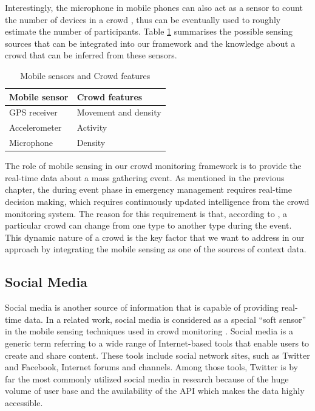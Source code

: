 Interestingly, the microphone in mobile phones can also act as a sensor to count the number of devices in a crowd \citep{Kannan2012, Xu2013}, thus can be eventually used to roughly estimate the number of participants. Table \ref{table:mobileSensingCrowdFeature} summarises the possible sensing sources that can be integrated into our framework and the knowledge about a crowd that can be inferred from these sensors.

\begin{table}
	\caption{Mobile sensors and Crowd features}
	\label{table:mobileSensingCrowdFeature}
	\centering
	\begin{tabular}{|l|l|}
		\hline
		\textbf{Mobile sensor} & \textbf{Crowd features} \\
		\hline
		GPS receiver & Movement and density \\
		\hline
		Accelerometer & Activity \\
		\hline
		Microphone & Density \\
		\hline
	\end{tabular}
\end{table}

The role of mobile sensing in our crowd monitoring framework is to provide the real-time data about a mass gathering event. As mentioned in the previous chapter, the during event phase in emergency management requires real-time decision making, which requires continuously updated intelligence from the crowd monitoring system. The reason for this requirement is that, according to \citet{Berlonghi1995}, a particular crowd can change from one type to another type during the event. This dynamic nature of a crowd is the key factor that we want to address in our approach by integrating the mobile sensing as one of the sources of context data.

\subsection{Social Media}

Social media is another source of information that is capable of providing real-time data. In a related work, social media is considered as a special ``soft sensor'' in the mobile sensing techniques used in crowd monitoring \citep{Ramesh2014}. Social media is a generic term referring to a wide range of Internet-based tools that enable users to create and share content. These tools include social network sites, such as Twitter and Facebook, Internet forums and channels. Among those tools, Twitter is by far the most commonly utilized social media in research because of the huge volume of user base and the availability of the API which makes the data highly accessible.

